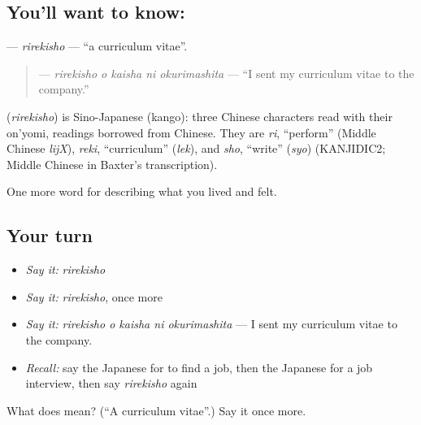 \subsection*{You'll want to know: }
\textbf{} — \emph{rirekisho} — \textquotedblleft{}a curriculum vitae\textquotedblright{}.

\begin{quote}
\textbf{  } — \emph{rirekisho o kaisha ni okurimashita} — \textquotedblleft{}I sent my curriculum vitae to the company.\textquotedblright{}
\end{quote}

\begin{cousinweb}
\textbf{} (\emph{rirekisho}) is Sino-Japanese (kango): three Chinese characters read with their on'yomi, readings borrowed from Chinese. They are \emph{ri}, \textquotedblleft{}perform\textquotedblright{} (Middle Chinese \emph{lijX}), \emph{reki}, \textquotedblleft{}curriculum\textquotedblright{} (\emph{lek}), and \emph{sho}, \textquotedblleft{}write\textquotedblright{} (\emph{syo}) (KANJIDIC2; Middle Chinese in Baxter's transcription).
\end{cousinweb}

\begin{grammarlens}[title={What you've built}]
One more word for describing what you lived and felt.
\end{grammarlens}

\subsection*{Your turn}
\begin{itemize}
\raggedright
  \item \emph{Say it:} \emph{rirekisho}
  \item \emph{Say it:} \emph{rirekisho}, once more
  \item \emph{Say it:} \emph{rirekisho o kaisha ni okurimashita} — I sent my curriculum vitae to the company.
  \item \emph{Recall:} say the Japanese for to find a job, then the Japanese for a job interview, then say \emph{rirekisho} again
\end{itemize}

\begin{tcolorbox}[breakable,colback=teal!4,colframe=teal!35!black,title={Before you move on}]
What does  mean? (\textquotedblleft{}A curriculum vitae\textquotedblright{}.) Say it once more.
\end{tcolorbox}

